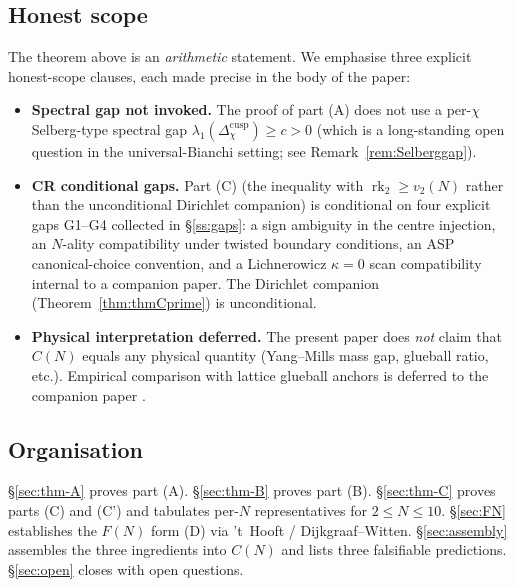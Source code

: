 \documentclass[11pt,a4paper,reqno]{amsart}
\theoremstyle{definition}
\DeclareMathOperator{\rk}{rk}
\newcommand{\vtwo}{v_2}
\newcommand{\Cinv}{C}
\begin{document}
\subsection{Honest scope}\label{ss:scope}

The theorem above is an \emph{arithmetic} statement.  We emphasise three
explicit honest-scope clauses, each made precise in the body of the paper:

\begin{itemize}[leftmargin=2em]
  \item \textbf{Spectral gap not invoked.} The proof of part (A) does not
        use a per-$\chi$ Selberg-type spectral gap
        $\lambda_{1}(\Delta_{\chi}^{\mathrm{cusp}})\ge c>0$ (which is a
        long-standing open question in the universal-Bianchi setting; see
        Remark~\ref{rem:Selberggap}).
  \item \textbf{CR conditional gaps.} Part (C) (the inequality with
        $\rk_{2}\ge\vtwo(N)$ rather than the unconditional Dirichlet
        companion) is conditional on four explicit gaps G1--G4 collected in
        \S\ref{ss:gaps}: a sign ambiguity in the centre injection, an
        $N$-ality compatibility under twisted boundary conditions, an
        ASP canonical-choice convention, and a Lichnerowicz $\kappa=0$ scan
        compatibility internal to a companion paper.  The
        Dirichlet companion (Theorem~\ref{thm:thmCprime}) is unconditional.
  \item \textbf{Physical interpretation deferred.} The present paper does
        \emph{not} claim that $\Cinv(N)$ equals any physical quantity
        (Yang--Mills mass gap, glueball ratio, etc.).  Empirical comparison
        with lattice glueball anchors \cite{Athenodorou2021} is deferred to
        the companion paper \cite{Remondiere2026Transport}.
\end{itemize}

\subsection{Organisation}\label{ss:organisation}

\S\ref{sec:thm-A} proves part (A).  \S\ref{sec:thm-B} proves part (B).
\S\ref{sec:thm-C} proves parts (C) and (C') and tabulates per-$N$
representatives for $2\le N\le 10$.  \S\ref{sec:FN} establishes the $F(N)$
form (D) via 't~Hooft / Dijkgraaf--Witten.  \S\ref{sec:assembly} assembles
the three ingredients into $\Cinv(N)$ and lists three falsifiable predictions.
\S\ref{sec:open} closes with open questions.
\end{document}
